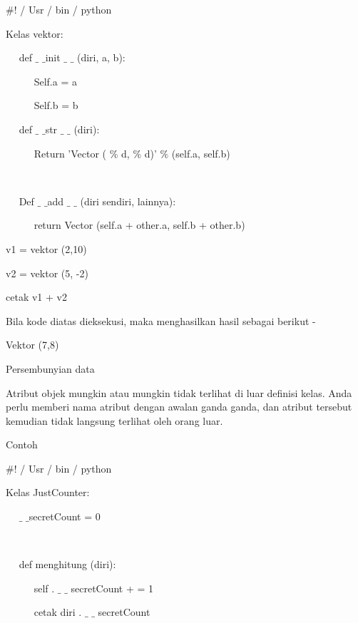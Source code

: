 \vspace{12pt}
 $  \#  $! / Usr / bin / python \par
\vspace{12pt}
Kelas vektor: \par
~~ def  $  \_  $ $  \_  $init  $  \_  $ $  \_  $ (diri, a, b): \par
~~~~~ Self.a = a \par
~~~~~ Self.b = b \par
\vspace{12pt}
~~ def  $  \_  $ $  \_  $str  $  \_  $ $  \_  $ (diri): \par
~~~~~ Return 'Vector ( $  \%  $ d, $  \%  $ d)' $  \%  $ (self.a, self.b) \par
~~  \par
~~ Def  $  \_  $ $  \_  $add  $  \_  $ $  \_  $ (diri sendiri, lainnya): \par
~~~~~ return Vector (self.a + other.a, self.b + other.b) \par
\vspace{12pt}
v1 = vektor (2,10) \par
v2 = vektor (5, -2) \par
cetak v1 + v2 \par
\vspace{12pt}
Bila kode diatas dieksekusi, maka menghasilkan hasil sebagai berikut - \par
\vspace{12pt}
Vektor (7,8) \par
\vspace{12pt}
Persembunyian data \par
\vspace{12pt}
Atribut objek mungkin atau mungkin tidak terlihat di luar definisi kelas. Anda perlu memberi nama atribut dengan awalan ganda ganda, dan atribut tersebut kemudian tidak langsung terlihat oleh orang luar. \par
Contoh \par
\vspace{12pt}
 $  \#  $! / Usr / bin / python \par
\vspace{12pt}
Kelas JustCounter: \par
~~  $  \_  $ $  \_  $secretCount = 0 \par
~  \par
~~ def menghitung (diri): \par
~~~~~ self . $  \_  $ $  \_  $ secretCount + = 1 \par
~~~~~ cetak diri . $  \_  $ $  \_  $ secretCount \par

